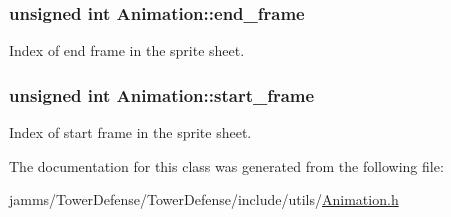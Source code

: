 \hypertarget{class_animation_a4dcf93e9ee175acaa8cc84f3241e8ee0}{
\subsubsection[{end\+\_\+frame}]{\setlength{\rightskip}{0pt plus 5cm}unsigned int Animation\+::end\+\_\+frame}}\label{class_animation_a4dcf93e9ee175acaa8cc84f3241e8ee0}


Index of end frame in the sprite sheet. 

\hypertarget{class_animation_a22f5936a58ca1850d5232a1cbfcb3426}{
\subsubsection[{start\+\_\+frame}]{\setlength{\rightskip}{0pt plus 5cm}unsigned int Animation\+::start\+\_\+frame}}\label{class_animation_a22f5936a58ca1850d5232a1cbfcb3426}


Index of start frame in the sprite sheet. 



The documentation for this class was generated from the following file\+:\begin{DoxyCompactItemize}
\item 
jamms/\+Tower\+Defense/\+Tower\+Defense/include/utils/\hyperlink{_animation_8h}{Animation.\+h}\end{DoxyCompactItemize}
